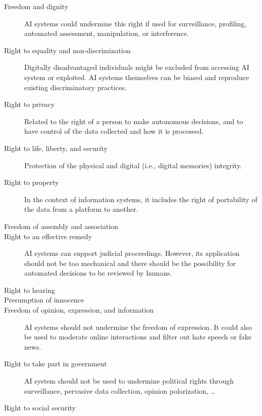 \begin{description}
    \item[Freedom and dignity] 
        AI systems could undermine this right if used for surveillance, profiling, automated assessment, manipulation, or interference.

    \item[Right to equality and non-discrimination]
        Digitally disadvantaged individuals might be excluded from accessing AI system or exploited. AI systems themselves can be biased and reproduce existing discriminatory practices.

    \item[Right to privacy]
        Related to the right of a person to make autonomous decisions, and to have control of the data collected and how it is processed. 

    \item[Right to life, liberty, and security]
        Protection of the physical and digital (i.e., digital memories) integrity.

    \item[Right to property]
        In the context of information systems, it includes the right of portability of the data from a platform to another.

    \item[Freedom of assembly and association]

    \item[Right to an effective remedy]
        AI systems can support judicial proceedings. However, its application should not be too mechanical and there should be the possibility for automated decisions to be reviewed by humans.

    \item[Right to hearing]
    
    \item[Presumption of innocence]
    
    \item[Freedom of opinion, expression, and information]
        AI systems should not undermine the freedom of expression. It could also be used to moderate online interactions and filter out hate speech or fake news.

    \item[Right to take part in government]
        AI system should not be used to undermine political rights through surveillance, pervasive data collection, opinion polarization, \dots

    \item[Right to social security]
    

\end{description}
